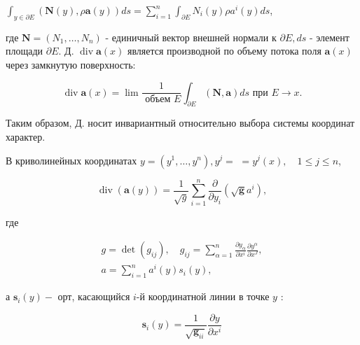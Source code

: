 \documentclass[10pt]{article}
\begin{document}
$\int_{y \in \partial E}(\boldsymbol{N}(y), \rho \boldsymbol{a}(y)) d s=\sum_{i=1}^{n} \int_{\partial E} N_{i}(y) \rho a^{i}(y) d s$,



где $\boldsymbol{N}=\left(N_{1}, \ldots, N_{n}\right)$ - единичный вектор внешней нормали к $\partial E, d s$ - элемент площади $\partial E$. Д. $\operatorname{div} \boldsymbol{a}(x)$ является производной по объему потока поля $\boldsymbol{a}(x)$ через замкнутую поверхность:



\[

\operatorname{div} \boldsymbol{a}(x)=\lim \frac{1}{\text { объем } E} \int_{\partial E}(\boldsymbol{N}, \boldsymbol{a}) d s \text { при } E \rightarrow x .

\]



Таким образом, Д. носит инвариантный относительно выбора системы координат характер.



В криволинейных координатах $y=\left(y^{1}, \ldots, y^{n}\right), y^{j}=$ $=y^{j}(x), \quad 1 \leqslant j \leqslant n$,



\[

\operatorname{div}(\boldsymbol{a}(y))=\frac{1}{\sqrt{g}} \sum_{i=1}^{n} \frac{\partial}{\partial y_{i}}\left(\sqrt{\boldsymbol{g}} a^{i}\right),

\]



где



\[

\begin{gathered}

g=\operatorname{det}\left(g_{i j}\right), \quad g_{i j}=\sum_{\alpha=1}^{n} \frac{\partial y_{\alpha}}{\partial x^{i}} \frac{\partial y^{\alpha}}{\partial x^{J}}, \\

a=\sum_{i=1}^{n} a^{i}(y) s_{i}(y),

\end{gathered}

\]



а $\boldsymbol{s}_{i}(y)-$ орт, касающийся $i$-й координатной линии в точке $y$ :



\[

\boldsymbol{s}_{i}(y)=\frac{1}{\sqrt{\boldsymbol{g}_{i i}}} \frac{\partial y}{\partial x^{i}}

\]
\end{document}
